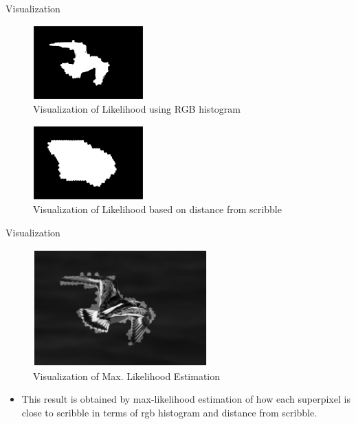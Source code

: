 \documentclass{beamer}
\begin{document}
\begin{frame}{Visualization}
		\begin{figure}[H]
			\begin{center}
				\includegraphics[width=0.38\textwidth]{likelihood_rgb.eps}
				\caption{Visualization of Likelihood using RGB histogram}
			\end{center}			
		\end{figure}		
		\begin{figure}[H]
			\begin{center}
				\includegraphics[width=0.38\textwidth]{likelihood_centroid.eps}
				\caption{Visualization of Likelihood based on distance from scribble}
			\end{center}			
		\end{figure}
\end{frame}
	

\begin{frame}{Visualization}	
	\begin{figure}[H]
		\begin{center}
			\includegraphics[width=0.60\textwidth]{likelihood_result.eps}
			\caption{Visualization of Max. Likelihood Estimation}
		\end{center}			
	\end{figure}
	
	\begin{itemize}
		\item {
			This result is obtained by max-likelihood estimation of how each superpixel is close to scribble in terms of rgb histogram and distance from scribble.
		}
	\end{itemize}
\end{frame}
\end{document}
